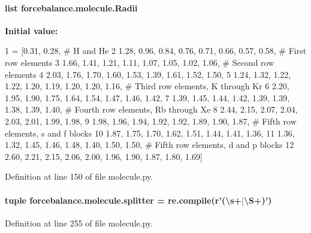 \hypertarget{namespaceforcebalance_1_1molecule_a74f55a89a14ca676b5a06441d1fdab19}{
\paragraph[{Radii}]{\setlength{\rightskip}{0pt plus 5cm}list forcebalance.\-molecule.\-Radii}}\label{namespaceforcebalance_1_1molecule_a74f55a89a14ca676b5a06441d1fdab19}
{\bfseries Initial value\-:}
\begin{DoxyCode}
1 = [0.31, 0.28, \textcolor{comment}{# H and He}
2          1.28, 0.96, 0.84, 0.76, 0.71, 0.66, 0.57, 0.58, \textcolor{comment}{# First row elements}
3          1.66, 1.41, 1.21, 1.11, 1.07, 1.05, 1.02, 1.06, \textcolor{comment}{# Second row elements}
4          2.03, 1.76, 1.70, 1.60, 1.53, 1.39, 1.61, 1.52, 1.50, 
5          1.24, 1.32, 1.22, 1.22, 1.20, 1.19, 1.20, 1.20, 1.16, \textcolor{comment}{# Third row elements, K through Kr}
6          2.20, 1.95, 1.90, 1.75, 1.64, 1.54, 1.47, 1.46, 1.42, 
7          1.39, 1.45, 1.44, 1.42, 1.39, 1.39, 1.38, 1.39, 1.40, \textcolor{comment}{# Fourth row elements, Rb through Xe}
8          2.44, 2.15, 2.07, 2.04, 2.03, 2.01, 1.99, 1.98, 
9          1.98, 1.96, 1.94, 1.92, 1.92, 1.89, 1.90, 1.87, \textcolor{comment}{# Fifth row elements, s and f blocks}
10          1.87, 1.75, 1.70, 1.62, 1.51, 1.44, 1.41, 1.36, 
11          1.36, 1.32, 1.45, 1.46, 1.48, 1.40, 1.50, 1.50, \textcolor{comment}{# Fifth row elements, d and p blocks}
12          2.60, 2.21, 2.15, 2.06, 2.00, 1.96, 1.90, 1.87, 1.80, 1.69]
\end{DoxyCode}


Definition at line 150 of file molecule.\-py.

\hypertarget{namespaceforcebalance_1_1molecule_a09d04113accea9c88b084051c5de29d1}{
\paragraph[{splitter}]{\setlength{\rightskip}{0pt plus 5cm}tuple forcebalance.\-molecule.\-splitter = re.\-compile(r'(\textbackslash{}s+$\vert$\textbackslash{}S+)')}}\label{namespaceforcebalance_1_1molecule_a09d04113accea9c88b084051c5de29d1}


Definition at line 255 of file molecule.\-py.

